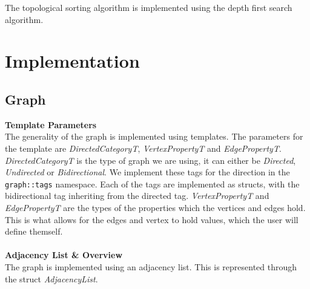 \documentclass{article}
\begin{document}
The topological sorting algorithm is implemented using the depth first search algorithm. 


\section{Implementation}

\subsection{Graph}
\textbf{Template Parameters}\\
\noindent
The generality of the graph is implemented using templates.
The parameters for the template are \textit{DirectedCategoryT}, \textit{VertexPropertyT} and \textit{EdgePropertyT}. 
\textit{DirectedCategoryT} is the type of graph we are using, it can either be \textit{Directed}, \textit{Undirected} or \textit{Bidirectional}. We implement these tags for the direction in the \texttt{graph::tags}  namespace. Each of the tags are implemented as structs, with the bidirectional tag inheriting from the directed tag.
\textit{VertexPropertyT} and \textit{EdgePropertyT} are the types of the properties which the vertices and edges hold. This is what allows for the edges and vertex to hold values, which the user will define themself.
\\\\
\textbf{Adjacency List \& Overview}\\
\noindent
The graph is implemented using an adjacency list. This is represented through the struct \textit{AdjacencyList}. 
\end{document}
